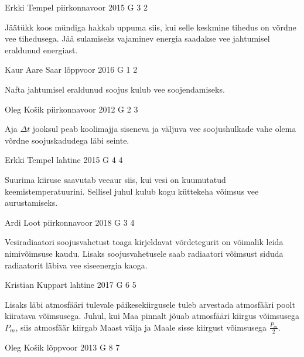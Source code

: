 \documentclass[11pt]{article}
\begin{document}
{%
{Erkki Tempel} %
{piirkonnavoor} %
{2015} %
{G 3} %
{2} %
{

\ifHint
Jäätükk koos mündiga hakkab uppuma siis, kui selle keskmine tihedus on võrdne vee tihedusega. Jää sulamiseks vajaminev energia saadakse vee jahtumisel eraldunud energiast.
\fi
}

{Kaur Aare Saar} %
{lõppvoor} %
{2016} %
{G 1} %
{2} %
{

\ifHint
Nafta jahtumisel eraldunud soojus kulub vee soojendamiseks.
\fi
}

{Oleg Košik} %
{piirkonnavoor} %
{2012} %
{G 2} %
{3} %
{

\ifHint
Aja $\Delta t$ jooksul peab koolimajja siseneva ja väljuva vee soojushulkade vahe olema võrdne soojuskadudega läbi seinte.
\fi
}

{Erkki Tempel} %
{lahtine} %
{2015} %
{G 4} %
{4} %
{

\ifHint
Suurima kiiruse saavutab veeaur siis, kui vesi on kuumutatud keemistemperatuurini. Sellisel juhul kulub kogu küttekeha võimsus vee aurustamiseks.
\fi
}

{Ardi Loot} %
{piirkonnavoor} %
{2018} %
{G 3} %
{4} %
{

\ifHint
Vesiradiaatori soojusvahetust toaga kirjeldavat võrdetegurit on võimalik leida nimivõimsuse kaudu. Lisaks soojusvahetusele saab radiaatori võimsust siduda radiaatorit läbiva vee siseenergia kaoga.
\fi
}

{Kristian Kuppart} %
{lahtine} %
{2017} %
{G 6} %
{5} %
{

\ifHint
Lisaks läbi atmosfääri tulevale päikesekiirgusele tuleb arvestada atmosfääri poolt kiiratava võimsusega. Juhul, kui Maa pinnalt jõuab atmosfääri kiirgus võimsusega $P_m$, siis atmosfäär kiirgab Maast välja ja Maale sisse kiirgust võimsusega $\frac{P_m}{2}$.
\fi
}

{Oleg Košik} %
{lõppvoor} %
{2013} %
{G 8} %
{7} %
{

}}
\end{document}
